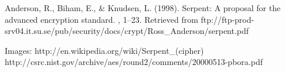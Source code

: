 \documentclass[12pt]{article} %
\begin{document}
\begin{thebibliography}{99} %

Anderson, R., Biham, E., \& Knudsen, L. (1998).
\newblock Serpent: A proposal for the advanced encryption standard.
, 1–23. Retrieved from ftp://ftp-prod-srv04.it.su.se/pub/security/docs/crypt/Ross\_Anderson/serpent.pdf

Images:
\bibitem http://en.wikipedia.org/wiki/Serpent\_(cipher)
\bibitem http://csrc.nist.gov/archive/aes/round2/comments/20000513-pbora.pdf
\end{thebibliography}

\end{document}
